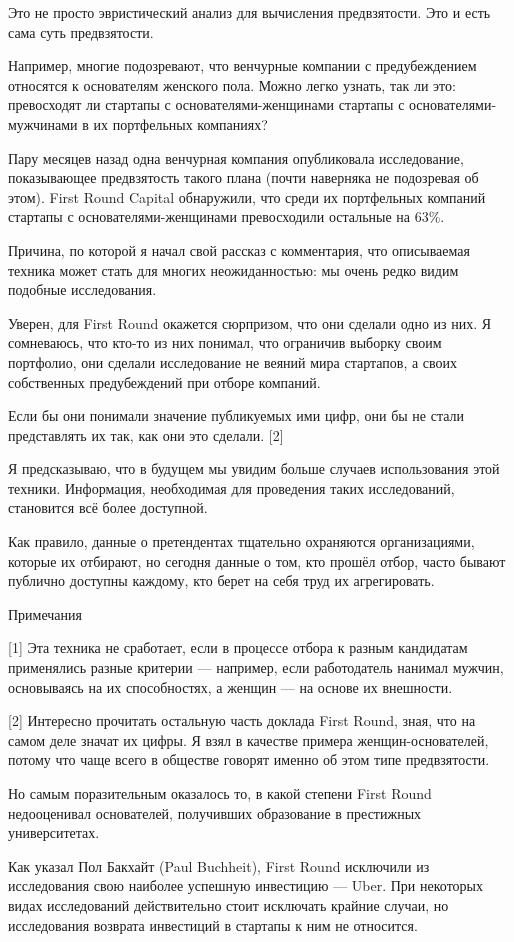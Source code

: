 \documentclass[ebook,12pt,oneside,openany]{memoir}
\begin{document}
Это не просто эвристический анализ для вычисления предвзятости. Это и
есть сама суть предвзятости.

Например, многие подозревают, что венчурные компании с предубеждением
относятся к основателям женского пола. Можно легко узнать, так ли это:
превосходят ли стартапы с основателями-женщинами стартапы с
основателями-мужчинами в их портфельных компаниях?

Пару месяцев назад одна венчурная компания опубликовала исследование,
показывающее предвзятость такого плана (почти наверняка не подозревая
об этом). First Round Capital обнаружили, что среди их портфельных
компаний стартапы с основателями-женщинами превосходили остальные на
63\%.

Причина, по которой я начал свой рассказ с комментария, что
описываемая техника может стать для многих неожиданностью: мы очень
редко видим подобные исследования.

Уверен, для First Round окажется сюрпризом, что они сделали одно из
них. Я сомневаюсь, что кто-то из них понимал, что ограничив выборку
своим портфолио, они сделали исследование не веяний мира стартапов, а
своих собственных предубеждений при отборе компаний.

Если бы они понимали значение публикуемых ими цифр, они бы не стали
представлять их так, как они это сделали. [2]

Я предсказываю, что в будущем мы увидим больше случаев использования
этой техники. Информация, необходимая для проведения таких
исследований, становится всё более доступной.

Как правило, данные о претендентах тщательно охраняются организациями,
которые их отбирают, но сегодня данные о том, кто прошёл отбор, часто
бывают публично доступны каждому, кто берет на себя труд их
агрегировать.

Примечания

[1] Эта техника не сработает, если в процессе отбора к разным
кандидатам применялись разные критерии — например, если работодатель
нанимал мужчин, основываясь на их способностях, а женщин — на основе
их внешности.

[2] Интересно прочитать остальную часть доклада First Round, зная, что
на самом деле значат их цифры. Я взял в качестве примера
женщин-основателей, потому что чаще всего в обществе говорят именно об
этом типе предвзятости.

Но самым поразительным оказалось то, в какой степени First Round
недооценивал основателей, получивших образование в престижных
университетах.

Как указал Пол Бакхайт (Paul Buchheit), First Round исключили из
исследования свою наиболее успешную инвестицию — Uber. При некоторых
видах исследований действительно стоит исключать крайние случаи, но
исследования возврата инвестиций в стартапы к ним не относится.
\end{document}
